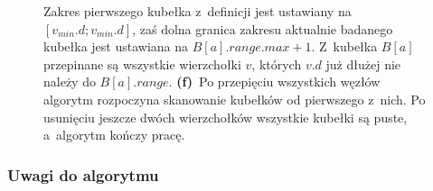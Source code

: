\begin{figure}[!ht]
{		Zakres pierwszego kubełka z~definicji jest ustawiany na $\left[ v_{min}.d ; v_{min}.d \right]$, zaś dolna granica zakresu aktualnie badanego kubełka jest ustawiana na $B \left[ a \right].range.max + 1$.
		Z~kubełka $B \left[ a \right]$ przepinane są wszystkie wierzchołki $v$, których $v.d$ już dłużej nie należy do $B \left[ a \right].range$.
		\textbf{(f)}~Po przepięciu wszystkich węzłów algorytm rozpoczyna skanowanie kubełków od pierwszego z~nich.
		Po usunięciu jeszcze dwóch wierzchołków wszystkie kubełki są puste, a~algorytm kończy pracę.
	}
	\label{fig:exampleRadixHeapC}
\end{figure}


\subsubsection{Uwagi do algorytmu}


